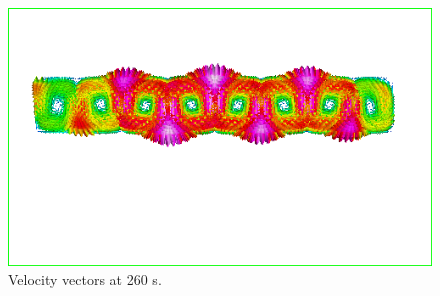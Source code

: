 \begin{figure}[h]
\centering
\includegraphics[width=150 mm, height=70 mm]{rb_vel}
\caption{Velocity vectors at 260 s.}\label{fg:rb_vel}
\end{figure} 
